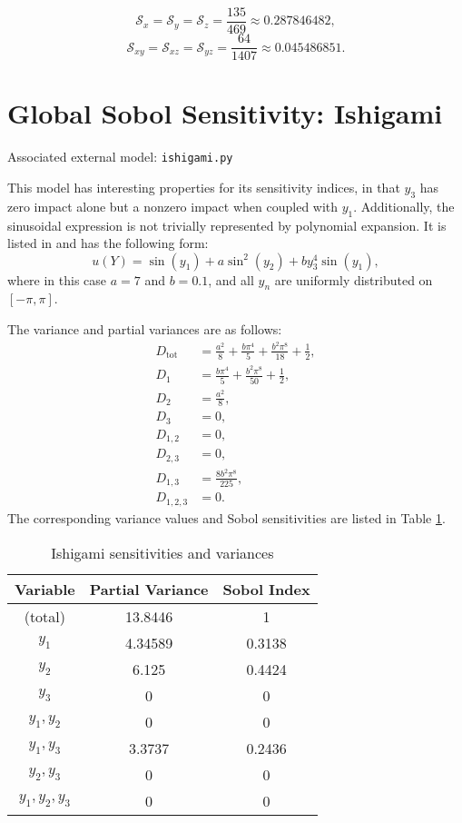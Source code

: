 \begin{equation}
  \mathcal{S}_x =\mathcal{S}_y = \mathcal{S}_z = \frac{135}{469} \approx 0.287846482, 
\end{equation}
\begin{equation}
  \mathcal{S}_{xy} =\mathcal{S}_{xz} = \mathcal{S}_{yz} = \frac{64}{1407} \approx 0.045486851. 
\end{equation}
%
%
%
%
%
%
%
\section{Global Sobol Sensitivity: Ishigami}
Associated external model: \texttt{ishigami.py}

This model has interesting properties for its sensitivity indices, in that $y_3$ has zero impact alone but a
nonzero impact when coupled with $y_1$.  Additionally, the sinusoidal expression is not trivially represented
by polynomial expansion.  It is listed in \cite{saltelli2000} and has the following form:
\begin{equation}
  u(Y) = \sin(y_1) + a\sin^2(y_2) + b y_3^4\sin(y_1),
\end{equation}
where in this case $a=7$ and $b=0.1$, and all $y_n$ are uniformly distributed on $[-\pi,\pi]$.

The variance and partial variances are as follows:
\begin{align}
  D_\text{tot} &= \frac{a^2}{8} + \frac{b\pi^4}{5} + \frac{b^2\pi^8}{18} + \frac{1}{2}, \\
  D_1 &= \frac{b\pi^4}{5} + \frac{b^2\pi^8}{50} + \frac{1}{2} ,\\
  D_2 &= \frac{a^2}{8}, \\
  D_3 &= 0, \\
  D_{1,2} &= 0, \\
  D_{2,3} &= 0, \\
  D_{1,3} &= \frac{8b^2\pi^8}{225}, \\
  D_{1,2,3} &= 0.
\end{align}
The corresponding variance values and Sobol sensitivities are listed in Table \ref{tab:ishigami sens}.
\begin{table}[h]
  \centering
  \begin{tabular}{c|c|c}
    Variable & Partial Variance & Sobol Index \\ \hline
    (total) & 13.8446 & 1 \\
    $y_1$         & 4.34589 & 0.3138 \\
    $y_2$         & 6.125   & 0.4424 \\
    $y_3$         & 0       & 0      \\
    $y_1,y_2$     & 0       & 0      \\
    $y_1,y_3$     & 3.3737  & 0.2436 \\
    $y_2,y_3$     & 0       & 0      \\
    $y_1,y_2,y_3$ & 0       & 0      \\
  \end{tabular}
  \caption{Ishigami sensitivities and variances}
  \label{tab:ishigami sens}
\end{table}

